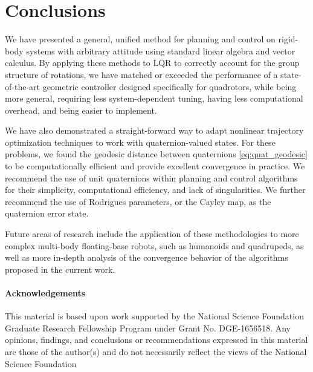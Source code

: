 \documentclass{svproc}
\begin{document}
        
\section{Conclusions} \label{sec:conclusion}
    We have presented a general, unified method for planning and control on rigid-body systems with arbitrary attitude using standard linear algebra and vector calculus. By applying these methods to LQR to correctly account for the group structure of rotations, we have matched or exceeded the performance of a state-of-the-art geometric controller designed specifically for quadrotors, while being more general, requiring less system-dependent tuning, having less computational overhead, and being easier to implement. 
    
    We have also demonstrated a straight-forward way to adapt nonlinear trajectory optimization techniques to work with quaternion-valued states.
    For these problems, we found the geodesic distance between quaternions \eqref{eq:quat_geodesic} to be computationally efficient and provide excellent convergence in practice. We recommend the use of unit quaternions within planning and control algorithms for their simplicity, computational efficiency, and lack of singularities. We further recommend the use of Rodrigues parameters, or the Cayley map, as the quaternion error state. 
    
    Future areas of research include the application of these methodologies to more complex multi-body floating-base robots, such as humanoids and quadrupeds, as well as more in-depth analysis of the convergence behavior of the algorithms proposed in the current work.
    
\paragraph{Acknowledgements}
This material is based upon work
supported by the National Science Foundation Graduate Research Fellowship Program under Grant No. DGE-1656518.
Any opinions, findings, and conclusions or recommendations
expressed in this material are those of the author(s) and
do not necessarily reflect the views of the National Science
Foundation


\printbibliography
\end{document}
